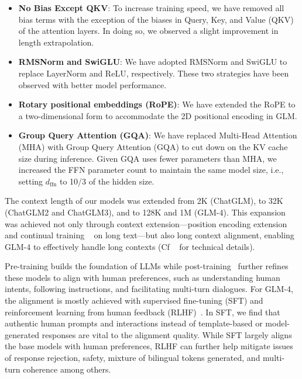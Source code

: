 \begin{itemize}[leftmargin=*,itemsep=0pt,parsep=0.2em,topsep=0.0em,partopsep=0.0em]
\item \textbf{No Bias Except QKV}: 
To increase training speed, we have removed all bias terms with the exception of the biases in Query, Key, and Value (QKV) of the attention layers. 
In doing so, we observed a slight improvement in length extrapolation.

\item \textbf{RMSNorm and SwiGLU}: 
We have adopted RMSNorm and SwiGLU to replace LayerNorm and ReLU, respectively. 
These two strategies have been observed with better model performance. 

\item \textbf{Rotary positional embeddings (RoPE)}: We have extended the RoPE to a two-dimensional form to accommodate the 2D positional encoding in GLM.

\item \textbf{Group Query Attention (GQA)}: 
We have replaced Multi-Head Attention (MHA) with Group Query Attention (GQA) to cut down on the KV cache size during inference. 
Given GQA uses fewer parameters than MHA, we increased the FFN parameter count to maintain the same model size, i.e., setting $d_{\mathrm{ffn}}$ to 10/3 of the hidden size.
\end{itemize}


The context length of our models was extended from 2K (ChatGLM), to 32K (ChatGLM2 and ChatGLM3), and to 128K and 1M (GLM-4). 
This expansion was achieved not only through context extension---position encoding extension ~\cite{press2022train,chen2023extending} and continual training ~\cite{xiong2023effective} on long text---but also long context alignment, enabling GLM-4 to effectively handle long contexts (Cf ~\cite{bai2024longalign} for technical details). 


Pre-training builds the foundation of LLMs while post-training~\cite{ouyang2022training} further refines these models to align with human preferences, such as understanding human intents, following instructions, and facilitating multi-turn dialogues. 
For GLM-4, the alignment is mostly achieved with supervised fine-tuning (SFT) and reinforcement learning from human feedback (RLHF)~\cite{hou2024chatglmrlhf}. 
In SFT, we find that authentic human prompts and interactions instead of template-based or model-generated responses are vital to the alignment quality. 
While SFT largely aligns the base models with human preferences, RLHF can further help mitigate  issues of response rejection, safety, mixture of bilingual tokens generated, and multi-turn coherence among others. 



